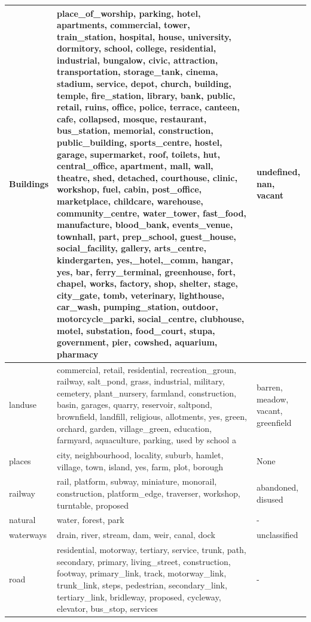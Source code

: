 \documentclass[a4paper,12pt]{Classes/RoboticsLaTeX}
\begin{document}
{\begin{longtable}{|p{2cm}|p{12cm}|p{2cm}|}
		Buildings & place\_of\_worship, parking, hotel, apartments, commercial, tower, train\_station, hospital, house, university, dormitory, school, college, residential, industrial, bungalow, civic, attraction, transportation, storage\_tank, cinema, stadium, service, depot, church, building, temple, fire\_station, library, bank, public, retail, ruins, office, police, terrace, canteen, cafe, collapsed, mosque, restaurant, bus\_station, memorial, construction, public\_building, sports\_centre, hostel, garage, supermarket, roof, toilets, hut, central\_office, apartment, mall, wall, theatre, shed, detached, courthouse, clinic, workshop, fuel, cabin, post\_office, marketplace, childcare, warehouse, community\_centre, water\_tower, fast\_food, manufacture, blood\_bank, events\_venue, townhall, part, prep\_school, guest\_house, social\_facility, gallery, arts\_centre, kindergarten, yes,\_hotel,\_comm, hangar, yes, bar, ferry\_terminal, greenhouse, fort, chapel, works, factory, shop, shelter, stage, city\_gate, tomb, veterinary, lighthouse, car\_wash, pumping\_station, outdoor, motorcycle\_parki, social\_centre, clubhouse, motel, substation, food\_court, stupa, government, pier, cowshed, aquarium, pharmacy & undefined, nan, vacant \\
		\hline
		landuse & commercial, retail, residential, recreation\_groun, railway, salt\_pond, grass, industrial, military, cemetery, plant\_nursery, farmland, construction, basin, garages, quarry, reservoir, saltpond, brownfield, landfill, religious, allotments, yes, green, orchard, garden, village\_green, education, farmyard, aquaculture, parking, used by school a & barren, meadow, vacant, greenfield \\
		\hline
		places & city, neighbourhood, locality, suburb, hamlet, village, town, island, yes, farm, plot, borough & None \\
		\hline
		railway & rail, platform, subway, miniature, monorail, construction, platform\_edge, traverser, workshop, turntable, proposed & abandoned, disused \\
		\hline
		natural & water, forest, park & - \\
		\hline
		waterways & drain, river, stream, dam, weir, canal, dock & unclassified \\
		\hline
		road & residential, motorway, tertiary, service, trunk, path, secondary, primary, living\_street, construction, footway, primary\_link, track, motorway\_link, trunk\_link, steps, pedestrian, secondary\_link, tertiary\_link, bridleway, proposed, cycleway, elevator, bus\_stop, services & - \\

\end{longtable}}
\end{document}

